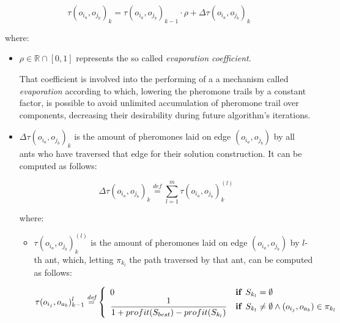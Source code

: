 \documentclass[12pt,a4paper]{report}
\newcommand{\mathDef}{\overset{\textit{def}}{=}}
\begin{document}
\begin{equation}
	\tau(o_{i_a}, o_{j_b})_k = \tau(o_{i_a}, o_{j_b})_{k-1} \cdot \rho + \Delta \tau(o_{i_a}, o_{j_b})_{k} 
\end{equation}

where:

\begin{itemize}
	
	\item $\rho \in \mathbb{R} \cap \left[0,1\right]$ represents the so called \textit{evaporation coefficient}. 
	
	That coefficient is involved into the performing of a a mechanism called \textit{evaporation} according to which, lowering the pheromone trails by a constant factor, is possible to avoid unlimited accumulation of pheromone trail over components, decreasing their desirability during future algorithm's iterations.
	
	\item $\Delta \tau(o_{i_a}, o_{j_b})_{k}$ is the amount of pheromones laid on edge $(o_{i_a}, o_{j_b})$ by all ants who have traversed that edge for their solution construction. It can be computed as follows:
	
	\begin{equation}
		\Delta \tau(o_{i_a}, o_{j_b})_{k} \mathDef \sum_{l=1}^{m} \tau(o_{i_a}, o_{j_b})_k^{(l)}
	\end{equation}
	
	where: 
	
	\begin{itemize}
		\item $\tau(o_{i_a}, o_{j_b})_k^{(l)}$ is the amount of pheromones laid on edge $(o_{i_a}, o_{j_b})$ by $l$-th ant, which, letting $\pi_{k_l}$ the path traversed by that ant, can be computed as follows:
		
		\begin{equation}
			\tau(o_{i_j}, o_{a_b})_{k-1}^{l} \mathDef \left\{ 
			\begin{array}{ll}
				0 & \text{\textbf{if }} S_{k_l} = \emptyset \\ 
				\displaystyle \frac{1}{1 + profit(S_{best}) - profit(S_{k_l})} & \text{\textbf{if }} S_{k_l} \neq \emptyset \wedge (o_{i_j}, o_{a_b}) \in \pi_{k_l} \\ 
			\end{array} \right.
		\end{equation}
		
		
	\end{itemize}
\end{itemize}
\end{document}
